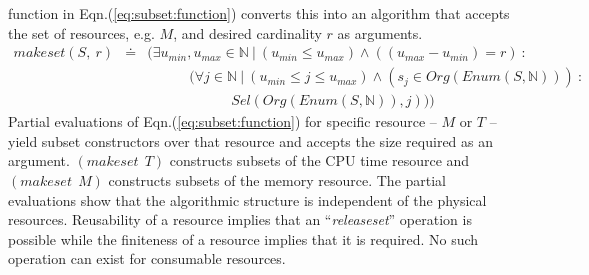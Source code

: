 \documentclass[draft]{article}
\def\names{\doteq}
\def\eqn#1{Eqn.(\ref{#1})}
\begin{document}
function in  \eqn{eq:subset:function} converts this  into an algorithm
that accepts the set of  resources, e.g.  $M$, and desired cardinality
$r$ as arguments.
\begin{eqnarray}
  \label{eq:subset:function}
  makeset (S,\ r) &\names& 
  \biggl(\exists u_{min}, u_{max} \in \mathbb{N}\ \vert\ (u_{min} \le
  u_{max}) \wedge ((u_{max} - u_{min}) = r)\ :
  \nonumber \\ &~&
  \quad\quad\quad
  \biggl(\forall j \in \mathbb{N}\ \vert\  (u_{min} \le j \le u_{max}) 
  \wedge (s_j \in Org(Enum(S,\mathbb{N})))\ :  
  \nonumber \\ &~&
  \quad\quad\quad \quad\quad\quad
  Sel(Org(Enum(S,\mathbb{N})), j) 
  \biggr)\biggr)
\end{eqnarray}
Partial evaluations of  \eqn{eq:subset:function} for specific resource
--  $M$ or $T$  -- yield  subset constructors  over that  resource and
accepts the size required as an argument.  $(makeset\ \ T)$ constructs
subsets  of the  CPU time  resource  and $(makeset\  \ M)$  constructs
subsets of the memory resource.  The partial evaluations show that the
algorithmic  structure  is  independent  of  the  physical  resources.
Reusability  of  a  resource  implies  that  an  ``\emph{releaseset}''
operation is possible while the  finiteness of a resource implies that
it is required.  No such operation can exist for consumable resources.
\end{document}
